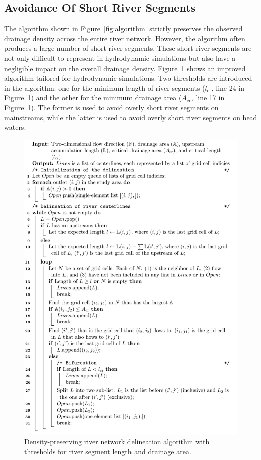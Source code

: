 \documentclass[water,article,submit,pdftex,moreauthors]{Definitions/mdpi}
\begin{document}
\subsection{Avoidance Of Short River Segments}
\label{sec:short}

The algorithm shown in Figure~\ref{fig:algorithm} strictly preserves the observed drainage density across the entire river network. However, the algorithm often produces a large number of short river segments. These short river segments are not only difficult to represent in hydrodynamic simulations but also have a negligible impact on the overall drainage density. Figure~\ref{fig:algorithm_improve} shows an improved algorithm tailored for hydrodynamic simulations. Two thresholds are introduced in the algorithm: one for the minimum length of river segments ($l_\mathrm{cr}$, line 24 in Figure~\ref{fig:algorithm_improve}) and the other for the minimum drainage area ($A_\mathrm{cr}$, line 17 in Figure~\ref{fig:algorithm_improve}). The former is used to avoid overly short river segments on mainstreams, while the latter is used to avoid overly short river segments on head waters.

\begin{figure}[H]
  \includegraphics[width=\textwidth]{algorithm_improve.pdf}
  \caption{Density-preserving river network delineation algorithm with thresholds for river segment length and drainage area.\label{fig:algorithm_improve}}
\end{figure}
\end{document}
